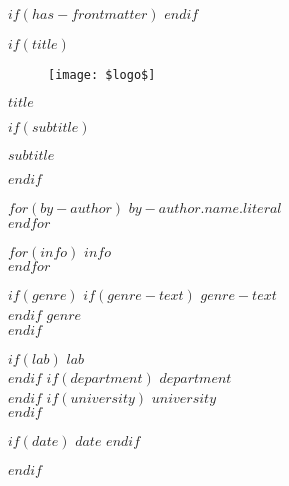 $if(has-frontmatter)$
    \frontmatter
$endif$


$if(title)$
    \cleardoublepage
    \thispagestyle{empty}

    {\centering

        \begin{figure}[h!]
            \begin{center}
                \texttt{[image: \$logo\$]}
            \end{center}
        \end{figure}
        
        \vfill

        {\Huge\bfseries $title$\\[5pt] } %
        
        $if(subtitle)$
            \vspace{1cm}
            {\Large\bfseries $subtitle$ \par}
        $endif$

        \vspace{1.5cm}

        $for(by-author)$
            {\LARGE\bfseries $by-author.name.literal$}\\[5pt]
        $endfor$

        \vspace{1cm}

        
        $for(info)$
        { $info$} \\[5pt]
        $endfor$

        $if(genre)$
            \vspace{1cm}
            $if(genre-text)$
            \textsc{$genre-text$} \\[1cm]
            $endif$
            \textsc{\Large{{$genre$}}} \\[5pt] %
        $endif$
        
        \vfill

        $if(lab)$
            {$lab$}\\[5pt] %
        $endif$
        $if(department)$
            {$department$}\\[5pt] %
        $endif$
        $if(university)$
            {$university$}\\[5pt] %
        $endif$

        \vfill
        $if(date)$
            {$date$} %
        $endif$

        
    }
$endif$

\cleardoublepage
